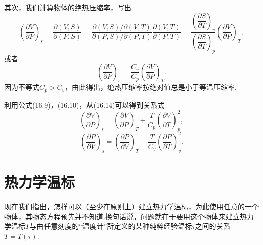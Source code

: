 其次，我们计算物体的绝热压缩率，写出
\begin{equation*}
  \left(\frac{\partial V}{\partial P}\right)_s
  =\frac{\partial(V,S)}{\partial(P,S)}
  =\frac{\partial(V,S)/\partial(V,T)}
  {\partial(P,S)/\partial(P,T)}
  \frac{\partial(V,T)}{\partial(P,T)}
  =\frac{\left(\dfrac{\partial S}{\partial T}\right)_v}
  {\left(\dfrac{\partial S}{\partial T}\right)_p}
  \left(\frac{\partial V}{\partial P}\right)_T,
\end{equation*}
或者
\begin{equation}
  \left(\frac{\partial V}{\partial P}\right)_s
  =\frac{C_v}{C_p}\left(\frac{\partial V}{\partial P}\right)_T.
\end{equation}
因为不等式$C_p>C_v$，由此得出，绝热压缩率按绝对值总是小于等温压缩率.

利用公式(16.9)，(16.10)，从(16.14)可以得到关系式
\begin{equation}
  \left(\frac{\partial V}{\partial P}\right)_s
  =\left(\frac{\partial V}{\partial P}\right)_T
  +\frac{T}{C_p}\left(\frac{\partial V}{\partial T}\right)_p^2,
\end{equation}
\begin{equation}
  \left(\frac{\partial P}{\partial V}\right)_s
  =\left(\frac{\partial P}{\partial V}\right)_T
  -\frac{T}{C_v}\left(\frac{\partial P}{\partial T}\right)_v^2.
\end{equation}

\section{热力学温标}

现在我们指出，怎样可以（至少在原则上）建立热力学温标，为此使用任意的一个物体，其物态方程预先并不知道.换句话说，问题就在于要用这个物体来建立热力学温标$T$与由任意刻度的“温度计”所定义的某种纯粹经验温标$\tau$之间的关系$T=T(\tau)$.

